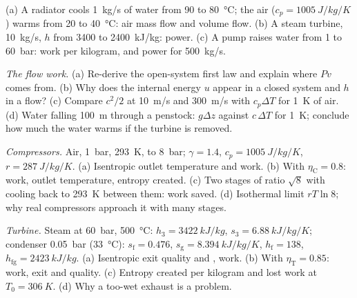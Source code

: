 \begin{exercise}[$\star$]\label{exo:b2:open-systems:4}
(a) A radiator cools \qty{1}{kg/s} of water from \qty{90}{} to \qty{80}{\celsius};
the air ($c_p = \qty{1005}{J/kg/K}$) warms from \qty{20}{} to \qty{40}{\celsius}:
air mass flow and volume flow. (b) A steam turbine, \qty{10}{kg/s},
$h$ from \qty{3400}{} to \qty{2400}{kJ/kg}: power. (c) A pump raises
water from \qty{1}{} to \qty{60}{bar}: work per kilogram, and power for
\qty{500}{kg/s}.
\end{exercise}

\begin{exercise}[$\star\star$]\label{exo:b2:open-systems:5}
\emph{The flow work.} (a) Re-derive the open-system first law and
explain where $Pv$ comes from. (b) Why does the internal energy $u$
appear in a closed system and $h$ in a flow? (c) Compare $c^2/2$ at
\qty{10}{m/s} and \qty{300}{m/s} with $c_p\Delta T$ for \qty{1}{K} of air.
(d) Water falling \qty{100}{m} through a penstock: $g\Delta z$ against
$c\,\Delta T$ for \qty{1}{K}; conclude how much the water warms if the
turbine is removed.
\end{exercise}

\begin{exercise}[$\star\star$]\label{exo:b2:open-systems:6}
\emph{Compressors.} Air, \qty{1}{bar}, \qty{293}{K}, to \qty{8}{bar}; $\gamma =
1.4$, $c_p = \qty{1005}{J/kg/K}$, $r = \qty{287}{J/kg/K}$. (a) Isentropic
outlet temperature and work. (b) With $\eta_{\text{C}} = 0.8$: work, outlet
temperature, entropy created. (c) Two stages of ratio $\sqrt8$ with
cooling back to \qty{293}{K} between them: work saved. (d) Isothermal
limit $rT\ln 8$; why real compressors approach it with many stages.
\end{exercise}

\begin{exercise}[$\star\star$]\label{exo:b2:open-systems:7}
\emph{Turbine.} Steam at \qty{60}{bar}, \qty{500}{\celsius}: $h_3 = \qty{3422}{kJ/kg}$,
$s_3 = \qty{6.88}{kJ/kg/K}$; condenser \qty{0.05}{bar} (\qty{33}{\celsius}):
$s_{\text{f}} = 0.476$, $s_{\text{g}} = \qty{8.394}{kJ/kg/K}$, $h_{\text{f}} = 138$,
$h_{\text{fg}} = \qty{2423}{kJ/kg}$. (a) Isentropic exit quality and
, work. (b) With $\eta_{\text{T}} = 0.85$: work, exit  and
quality. (c) Entropy created per kilogram and lost work at $T_0 =
\qty{306}{K}$. (d) Why a too-wet exhaust is a problem.
\end{exercise}


